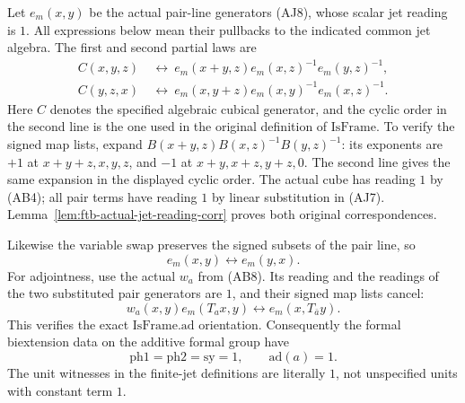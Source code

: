 Let \(e_m(x,y)\) be the actual pair-line generators (AJ8),
whose scalar jet reading is \(1\).
All expressions below mean their pullbacks to the indicated
common jet algebra.
The first and second partial laws are
\[
 \begin{split}
 C(x,y,z)&\ \longleftrightarrow\
          e_m(x+y,z)e_m(x,z)^{-1}e_m(y,z)^{-1},\\
 C(y,z,x)&\ \longleftrightarrow\
          e_m(x,y+z)e_m(x,y)^{-1}e_m(x,z)^{-1}.
 \end{split}                                             \tag{AB9}
\]
Here \(C\) denotes the specified algebraic cubical generator,
and the cyclic order in the second line is the one used in
the original definition of \(\mathrm{IsFrame}\).
To verify the signed map lists, expand
\(B(x+y,z)B(x,z)^{-1}B(y,z)^{-1}\):
its exponents are \(+1\) at \(x+y+z,x,y,z\),
and \(-1\) at \(x+y,x+z,y+z,0\).
The second line gives the same expansion in the displayed
cyclic order. The actual cube has reading \(1\) by (AB4);
all pair terms have reading \(1\) by linear substitution in
(AJ7). Lemma~\ref{lem:ftb-actual-jet-reading-corr} proves
both original correspondences.

Likewise the variable swap preserves the signed subsets
of the pair line, so
\[
                             e_m(x,y)\longleftrightarrow e_m(y,x).
                                                               \tag{AB10}
\]
For adjointness, use the actual \(w_a\) from (AB8).
Its reading and the readings of the two substituted pair
generators are \(1\), and their signed map lists cancel:
\[
                    w_a(x,y)e_m(T_ax,y)
                                  \longleftrightarrow e_m(x,T_{\bar a}y).
                                                               \tag{AB11}
\]
This verifies the exact \(\mathrm{IsFrame.ad}\) orientation.
Consequently the formal biextension data on the additive
formal group have
\[
                    \mathrm{ph1}=\mathrm{ph2}=\mathrm{sy}=1,
                       \qquad \mathrm{ad}(a)=1.           \tag{AB12}
\]
The unit witnesses in the finite-jet definitions are literally
\(1\), not unspecified units with constant term \(1\).


